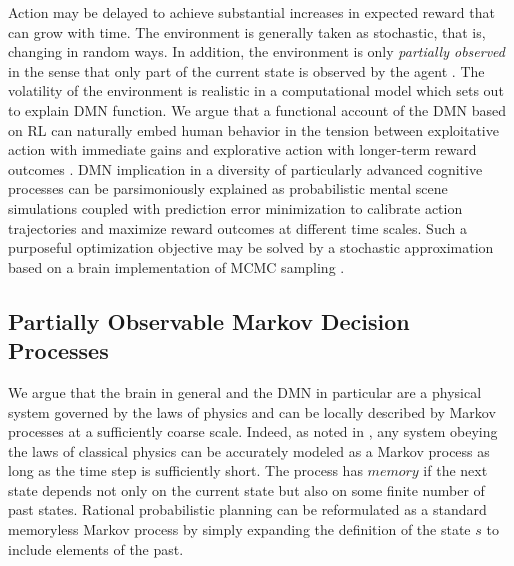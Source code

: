 \documentclass[10pt,letterpaper]{article}
\begin{document}
Action may be delayed to achieve substantial increases in expected reward
that can grow with time.
The environment is generally taken as stochastic,
that is, changing in random ways. In addition,
the environment is only \textit{partially observed}
in the sense that only part of the current state is observed by
the agent \citep{starkweather2017dopamine}.
The volatility of the environment
is realistic in a computational model which sets out
to explain DMN function.
We argue that a functional account of the DMN based on RL
can naturally embed human behavior
in the tension between exploitative action with immediate gains and
explorative action with longer-term reward outcomes
\citep{dayan2008decision}.
DMN implication in a diversity of
particularly advanced cognitive processes
can be parsimoniously explained as probabilistic mental
scene simulations coupled with prediction error minimization
to calibrate action trajectories and
maximize reward outcomes at different time scales.
Such a purposeful optimization objective
may be solved by a stochastic approximation
based on a brain implementation of MCMC sampling
\citep{tenenbaum2011grow}.



\subsection{Partially Observable Markov Decision Processes}
We argue that the brain in general and the DMN in particular
are a physical system governed by the laws of
physics and can be locally described by Markov processes at a sufficiently coarse scale.
Indeed, as noted in \citep{tegmark2016improved},
any system obeying the laws of classical physics can be accurately modeled as a Markov process as long as the time
step is sufficiently short.
The process has $memory$ if the next state depends not only on the current state but also on some finite
number of past states.
Rational probabilistic planning can be reformulated
as a standard memoryless Markov process by simply expanding the
definition of the state $s$ to include elements of the past.
\end{document}
